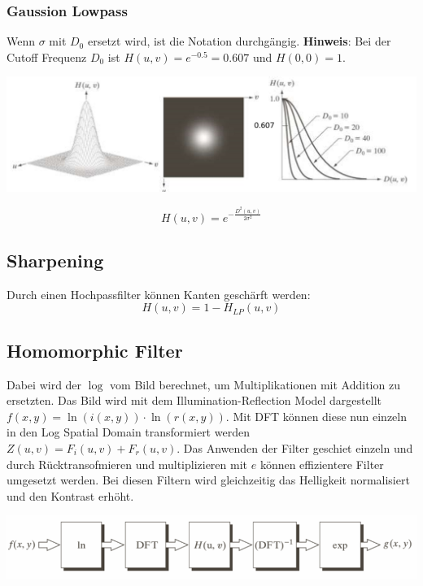 \subsubsection{Gaussion Lowpass}
Wenn $\sigma$ mit $D_0$ ersetzt wird, ist die Notation durchgängig. \textbf{Hinweis}: Bei der Cutoff Frequenz $D_0$ ist $H(u,v) = e^{-0.5} = 0.607$ und $H(0,0) = 1$.
\begin{center}
	\includegraphics[width=\columnwidth]{Images/gaussian}
\end{center}

\[
H(u,v) = e^{-\frac{D^2(u,v)}{2\sigma^2}}
\]

\subsection{Sharpening}
Durch einen Hochpassfilter können Kanten geschärft werden:
\[
H(u,v) = 1- H_{LP}(u,v)
\]

\subsection{Homomorphic Filter}
Dabei wird der $\log$ vom Bild berechnet, um Multiplikationen mit Addition zu ersetzten. Das Bild wird mit dem Illumination-Reflection Model dargestellt $f(x,y) = \ln(i(x,y)) \cdot \ln (r(x,y))$. Mit DFT können diese nun einzeln in den Log Spatial Domain transformiert werden $Z(u,v) = F_i(u,v) + F_r(u,v)$. Das Anwenden der Filter geschiet einzeln und durch Rücktransofmieren und multiplizieren mit $e$ können effizientere Filter umgesetzt werden. Bei diesen Filtern wird gleichzeitig das Helligkeit normalisiert und den Kontrast erhöht.
\begin{center}
	\includegraphics[width=\columnwidth]{Images/homorphobic}
\end{center}

